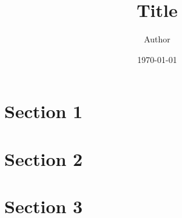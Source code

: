 \documentclass[10pt]{article}
\title{Title}
\author{Author}
\date{\today}
\begin{document}
\maketitle

\section{Section 1}
\label{sec:section-1}



\section{Section 2}
\label{sec:section-2}



\section{Section 3}
\label{sec:section-3}






\end{document}
